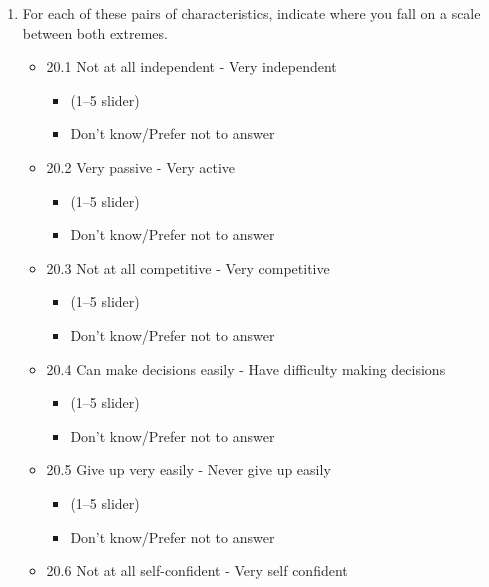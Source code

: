 \documentclass[
  letterpaper,
  DIV=11,
  numbers=noendperiod]{scrreprt}
\providecommand{\tightlist}{%
  \setlength{\itemsep}{0pt}\setlength{\parskip}{0pt}}\usepackage{longtable,booktabs,array}
\begin{document}
\begin{enumerate}
\def\labelenumi{\arabic{enumi}.}
\setcounter{enumi}{19}
\item
  For each of these pairs of characteristics, indicate where you fall on
  a scale between both extremes.

  \begin{itemize}
  \tightlist
  \item
    20.1 Not at all independent - Very independent

    \begin{itemize}
    \tightlist
    \item
      (1--5 slider)
    \item
      Don't know/Prefer not to answer
    \end{itemize}
  \item
    20.2 Very passive - Very active

    \begin{itemize}
    \tightlist
    \item
      (1--5 slider)
    \item
      Don't know/Prefer not to answer
    \end{itemize}
  \item
    20.3 Not at all competitive - Very competitive

    \begin{itemize}
    \tightlist
    \item
      (1--5 slider)
    \item
      Don't know/Prefer not to answer
    \end{itemize}
  \item
    20.4 Can make decisions easily - Have difficulty making decisions

    \begin{itemize}
    \tightlist
    \item
      (1--5 slider)
    \item
      Don't know/Prefer not to answer
    \end{itemize}
  \item
    20.5 Give up very easily - Never give up easily

    \begin{itemize}
    \tightlist
    \item
      (1--5 slider)
    \item
      Don't know/Prefer not to answer
    \end{itemize}
  \item
    20.6 Not at all self-confident - Very self confident


\end{itemize}
\end{enumerate}
\end{document}
